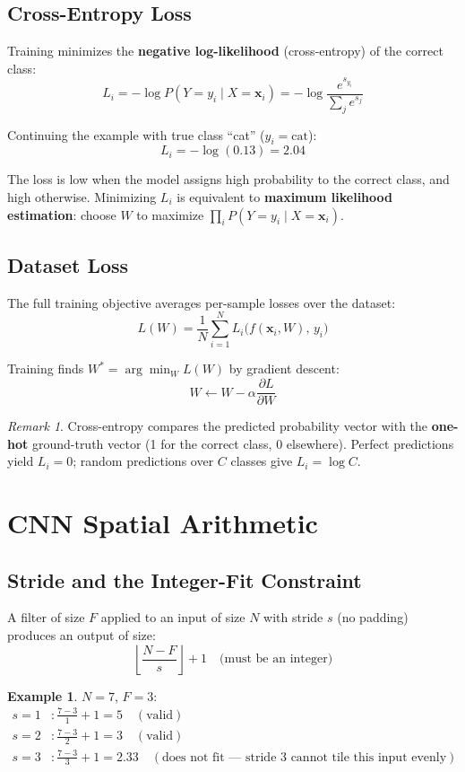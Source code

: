 \documentclass[11pt,a4paper]{article}
\theoremstyle{definition}
\newtheorem{example}{Example}[section]
\theoremstyle{plain}
\theoremstyle{remark}
\newtheorem*{remark}{Remark}
\begin{document}
\subsection{Cross-Entropy Loss}

Training minimizes the \textbf{negative log-likelihood} (cross-entropy) of the correct class:
\[
    L_i = -\log P(Y = y_i \mid X = \mathbf{x}_i) = -\log \frac{e^{s_{y_i}}}{\sum_j e^{s_j}}
\]

Continuing the example with true class ``cat'' ($y_i = \text{cat}$):
\[
    L_i = -\log(0.13) = 2.04
\]

The loss is low when the model assigns high probability to the correct class, and high otherwise.
Minimizing $L_i$ is equivalent to \textbf{maximum likelihood estimation}: choose $W$ to maximize $\prod_i P(Y = y_i \mid X = \mathbf{x}_i)$.

\subsection{Dataset Loss}

The full training objective averages per-sample losses over the dataset:
\[
    L(W) = \frac{1}{N} \sum_{i=1}^{N} L_i\!\bigl(f(\mathbf{x}_i, W),\, y_i\bigr)
\]

Training finds $W^* = \arg\min_W L(W)$ by gradient descent:
\[
    W \leftarrow W - \alpha \frac{\partial L}{\partial W}
\]

\begin{remark}
Cross-entropy compares the predicted probability vector with the \textbf{one-hot} ground-truth vector (1 for the correct class, 0 elsewhere). Perfect predictions yield $L_i = 0$; random predictions over $C$ classes give $L_i = \log C$.
\end{remark}


\section{CNN Spatial Arithmetic}

\subsection{Stride and the Integer-Fit Constraint}

A filter of size $F$ applied to an input of size $N$ with stride $s$ (no padding) produces an output of size:
\[
    \left\lfloor \frac{N - F}{s} \right\rfloor + 1 \quad \text{(must be an integer)}
\]

\begin{example}
$N = 7$, $F = 3$:
\begin{align*}
    s = 1 &: \frac{7-3}{1} + 1 = 5 \quad (\text{valid}) \\
    s = 2 &: \frac{7-3}{2} + 1 = 3 \quad (\text{valid}) \\
    s = 3 &: \frac{7-3}{3} + 1 = 2.33 \quad (\text{does not fit --- stride 3 cannot tile this input evenly})
\end{align*}
\end{example}
\end{document}
